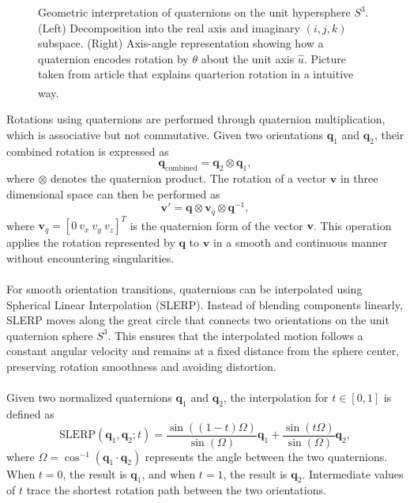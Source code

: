 \begin{figure}[H]
\begin{minipage}[b]{0.32\linewidth}
    \end{minipage}
    \caption{Geometric interpretation of quaternions on the unit hypersphere $S^3$. (Left) Decomposition into the real axis and imaginary $(i, j, k)$ subspace. (Right) Axis-angle representation showing how a quaternion encodes rotation by $\theta$ about the unit axis $\hat{u}$. Picture taken from article that explains quarterion rotation in a intuitive way.\textsuperscript{\cite{quaternions_explained}}}
    \label{fig:system-modeling-quaternion-geometry}
\end{figure}
\noindent
Rotations using quaternions are performed through quaternion multiplication, which is associative but not commutative. Given two orientations $\mathbf{q}_1$ and $\mathbf{q}_2$, their combined rotation is expressed as
$$
    \mathbf{q}_{\text{combined}} = \mathbf{q}_2 \otimes \mathbf{q}_1,
$$
where $\otimes$ denotes the quaternion product. The rotation of a vector $\mathbf{v}$ in three dimensional space can then be performed as
$$
    \mathbf{v}' = \mathbf{q} \otimes \mathbf{v}_q \otimes \mathbf{q}^{-1},
$$
where $\mathbf{v}_q = [0~v_x~v_y~v_z]^T$ is the quaternion form of the vector $\mathbf{v}$. This operation applies the rotation represented by $\mathbf{q}$ to $\mathbf{v}$ in a smooth and continuous manner without encountering singularities.  
\\ \\
For smooth orientation transitions, quaternions can be interpolated using Spherical Linear Interpolation (SLERP). Instead of blending components linearly, SLERP moves along the great circle that connects two orientations on the unit quaternion sphere $S^3$. This ensures that the interpolated motion follows a constant angular velocity and remains at a fixed distance from the sphere center, preserving rotation smoothness and avoiding distortion.  
\\ \\
Given two normalized quaternions $\mathbf{q}_1$ and $\mathbf{q}_2$, the interpolation for $t \in [0,1]$ is defined as
$$
    \text{SLERP}(\mathbf{q}_1, \mathbf{q}_2; t) =
    \frac{\sin((1-t)\Omega)}{\sin(\Omega)}\mathbf{q}_1 +
    \frac{\sin(t\Omega)}{\sin(\Omega)}\mathbf{q}_2,
$$
where $\Omega = \cos^{-1}(\mathbf{q}_1 \cdot \mathbf{q}_2)$ represents the angle between the two quaternions. When $t = 0$, the result is $\mathbf{q}_1$, and when $t = 1$, the result is $\mathbf{q}_2$. Intermediate values of $t$ trace the shortest rotation path between the two orientations.  
\\ \\
